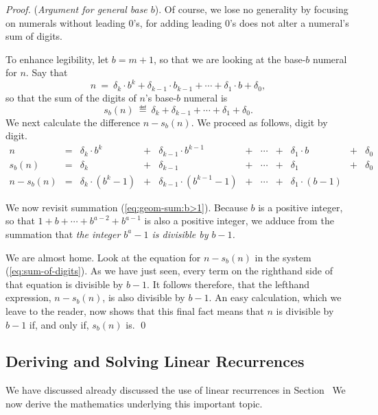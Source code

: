 \documentclass{article}
\begin{document}
\begin{proof}
({\it Argument for general base $b$}).
%
Of course, we lose no generality by focusing on numerals without
leading $0$'s, for adding leading $0$'s does not alter a numeral's sum
of digits.

To enhance legibility, let $b = m+1$, so that we are looking at the
base-$b$ numeral for $n$.  Say that
\[ n \ = \ \delta_k \cdot b^k + \delta_{k-1} \cdot b_{k-1} + \cdots +
\delta_1 \cdot b + \delta_0, \]
so that the sum of the digits of $n$'s base-$b$ numeral is
\[ s_b(n) \ \eqdef \ \delta_k + \delta_{k-1} + \cdots + \delta_1 + \delta_0. \]
We next calculate the difference $n - s_b(n)$.  We proceed as
follows, digit by digit.
\begin{equation}
\label{eq:sum-of-digits}
\begin{array}{ccccccccccc}
n & = &
\delta_k \cdot b^k & + & \delta_{k-1} \cdot b^{k-1} & + & \cdots
  & + & \delta_1 \cdot b & + & \delta_0 \\
s_b(n) & = &
\delta_k & + & \delta_{k-1} & + & \cdots & + & \delta_1 & + & \delta_0 \\
\hline
n - s_b(n) & = &
\delta_k \cdot (b^k -1) & + &
\delta_{k-1} \cdot (b^{k-1} -1) & + &
\cdots & + &
\delta_1 \cdot (b-1) & & 
\end{array}
\end{equation}

We now revisit summation (\ref{eq:geom-sum:b>1}).  Because $b$ is a
positive integer, so that $1 + b + \cdots + b^{a-2} + b^{a-1}$ is also
a positive integer, we adduce from the summation that {\em the integer
  $b^a -1$ is divisible by $b-1$.}

We are almost home.  Look at the equation for $n - s_b(n)$ in the
system (\ref{eq:sum-of-digits}).  As we have just seen, every term on
the righthand side of that equation is divisible by $b-1$.  It follows
therefore, that the lefthand expression, $n - s_b(n)$, is also
divisible by $b-1$.  An easy calculation, which we leave to the
reader, now shows that this final fact means that $n$ is divisible by
$b-1$ if, and only if, $s_b(n)$ is.  \qed
\end{proof}


\subsection{Deriving and Solving Linear Recurrences}
\label{sec:linear-recurrences-2}

We have discussed already discussed the use of linear recurrences in
Section~%
 We now derive the mathematics
underlying this important topic.
\end{document}
